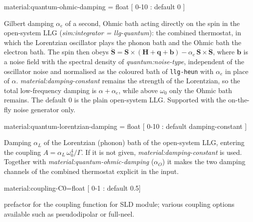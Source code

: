 {\zicf material:quantum-ohmic-damping = float [ 0-10 : default 0 ]}
Gilbert damping $\alpha_e$ of a second, Ohmic bath acting directly on the spin in the open-system LLG (\textit{sim:integrator = llg-quantum}): the combined thermostat, in which the Lorentzian oscillator plays the phonon bath and the Ohmic bath the electron bath. The spin then obeys $\dot{\mathbf{S}} = \mathbf{S}\times(\mathbf{H}+\mathbf{q}+\mathbf{b}) - \alpha_e\,\mathbf{S}\times\dot{\mathbf{S}}$, where $\mathbf{b}$ is a noise field with the spectral density of \textit{quantum:noise-type}, independent of the oscillator noise and normalised as the coloured bath of \texttt{llg-heun} with $\alpha_e$ in place of $\alpha$. \textit{material:damping-constant} remains the strength of the Lorentzian, so the total low-frequency damping is $\alpha + \alpha_e$, while above $\omega_0$ only the Ohmic bath remains. The default 0 is the plain open-system LLG. Supported with the on-the-fly noise generator only.

{\zicf material:quantum-lorentzian-damping = float [ 0-10 : default damping-constant ]}
Damping $\alpha_L$ of the Lorentzian (phonon) bath of the open-system LLG, entering the coupling $A = \alpha_L\,\omega_0^4/\Gamma$. If it is not given, \textit{material:damping-constant} is used. Together with \textit{material:quantum-ohmic-damping} ($\alpha_O$) it makes the two damping channels of the combined thermostat explicit in the input.


{\zicf material:coupling-C0=float [ 0-1 : default 0.5]}  prefactor for the coupling function for SLD module; various coupling options available such as pseudodipolar or full-neel.











%
